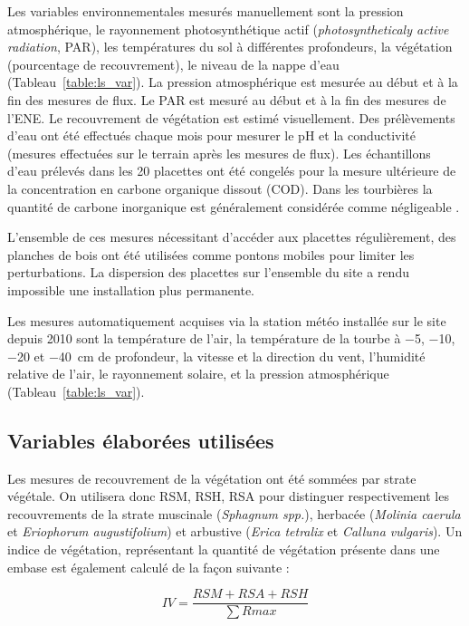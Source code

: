 Les variables environnementales mesurés manuellement sont la pression atmosphérique, le rayonnement photosynthétique actif (\textit{photosyntheticaly active radiation}, PAR), les températures du sol à différentes profondeurs, la végétation (pourcentage de recouvrement), le niveau de la nappe d'eau (Tableau~\ref{table:ls_var}).
La pression atmosphérique est mesurée au début et à la fin des mesures de flux.
Le PAR est mesuré au début et à la fin des mesures de l'ENE.
Le recouvrement de végétation est estimé visuellement.
Des prélèvements d'eau ont été effectués chaque mois pour mesurer le pH et la conductivité (mesures effectuées sur le terrain après les mesures de flux).
Les échantillons d'eau prélevés dans les 20 placettes ont été congelés pour la mesure ultérieure de la concentration en carbone organique dissout (COD).
Dans les tourbières la quantité de carbone inorganique est généralement considérée comme négligeable \citep{worrall2009}.

L'ensemble de ces mesures nécessitant d'accéder aux placettes régulièrement, des planches de bois ont été utilisées comme pontons mobiles pour limiter les perturbations. La dispersion des placettes sur l'ensemble du site a rendu impossible une installation plus permanente.

Les mesures automatiquement acquises via la station météo installée sur le site depuis 2010 sont la température de l'air, la température de la tourbe à \num{-5}, \num{-10}, \num{-20} et \SI{-40}{\centi\metre} de profondeur, la vitesse et la direction du vent, l'humidité relative de l'air, le rayonnement solaire, et la pression atmosphérique (Tableau~\ref{table:ls_var}).

\subsection{Variables élaborées utilisées}

Les mesures de recouvrement de la végétation ont été sommées par strate végétale.
On utilisera donc RSM, RSH, RSA pour distinguer respectivement les recouvrements de la strate muscinale (\textit{Sphagnum spp.}), herbacée (\textit{Molinia caerula} et \textit{Eriophorum augustifolium}) et arbustive (\textit{Erica tetralix} et \textit{Calluna vulgaris}).
Un indice de végétation, représentant la quantité de végétation présente dans une embase est également calculé de la façon suivante : 

\begin{equation}
IV = \frac{RSM + RSA + RSH}{\sum R{max}}
\end{equation}

